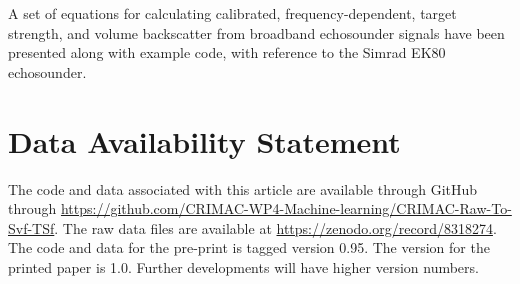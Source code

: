 \documentclass[preprint,12pt,TurnOnLineNumbers]{JASAnew}
\newcommand{\ek}{Simrad EK80}
\begin{document}
A set of equations for calculating calibrated, frequency-dependent, target strength, and volume backscatter from broadband echosounder signals have been presented along with example code, with reference to the \ek{} echosounder.

\section{Data Availability Statement} \label{dataavstatement}

The code and data associated with this article are available through GitHub through \url{https://github.com/CRIMAC-WP4-Machine-learning/CRIMAC-Raw-To-Svf-TSf}. The raw data files are available at \url{https://zenodo.org/record/8318274}. The code and data for the pre-print is tagged version 0.95. The version for the printed paper is 1.0. Further developments will have higher version numbers.


\end{document}
